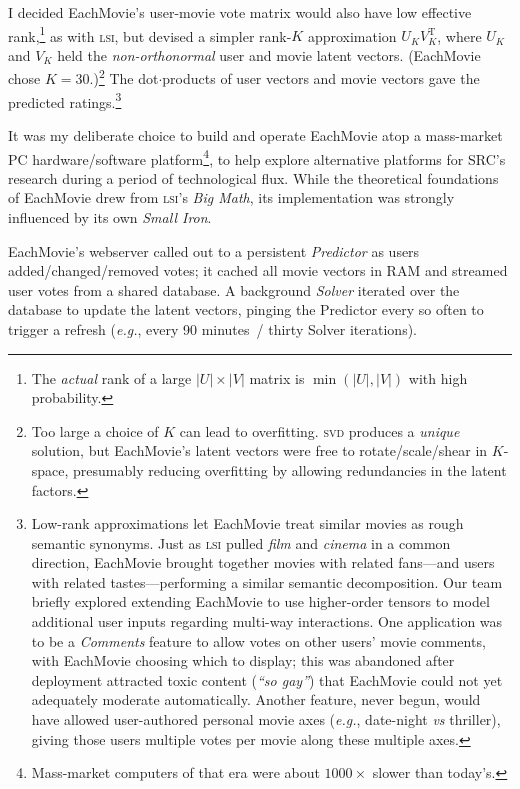 \documentclass[sigconf,authorversion,screen,microtype={protrusion=true,expansion,kerning,spacing}]{acmart}
\begin{document}
I decided EachMovie's user-movie vote matrix would also have low effective rank,\footnote{The \emph{actual} rank of a large $|U| \times |V|$ matrix is $\min(|U|, |V|)$ with high probability.} as with \textsc{lsi}, but devised a simpler rank-$K$ approximation $U_K V_K^\mathrm{T}$, where $U_K$ and $V_K$ held the \emph{non-orthonormal} user and movie latent vectors. (EachMovie chose $K = 30$.)\footnote{Too large a choice of $K$ can lead to overfitting. \textsc{svd} produces a \emph{unique} solution, but EachMovie's latent vectors were free to rotate/\allowbreak{}scale/\allowbreak{}shear in $K$-space, presumably reducing overfitting by allowing redundancies  in the latent factors.} The dot$\cdot$\allowbreak{}products of user vectors and movie vectors gave the predicted ratings.\footnote{Low-rank approximations let EachMovie treat similar movies as rough semantic synonyms. Just as \textsc{lsi} pulled \textit{film} and \textit{cinema} in a common direction, EachMovie brought together movies with related fans---and users with related tastes---performing a similar semantic decomposition. Our team briefly explored extending EachMovie to use higher-order tensors to model additional user inputs regarding multi-way interactions. One application was to be a \textit{Comments} feature to allow votes on other users' movie comments, with EachMovie choosing which to display; this was abandoned after deployment attracted toxic content (\emph{``so gay''}) that EachMovie could not yet adequately moderate automatically. Another feature, never begun, would have allowed user-authored personal movie axes (\textit{e.g.}, date-night \textit{vs} thriller), giving those users multiple votes per movie along these multiple axes.} 

It was my deliberate choice to build and operate EachMovie atop a mass-market PC hardware/\allowbreak{}software platform\footnote{Mass-market computers of that era were about $1000\times$ slower than today's.}, to help explore alternative platforms for SRC's research during a period of technological flux. While the theoretical foundations of EachMovie drew from \textsc{lsi}'s \emph{Big Math}, its implementation was strongly influenced by its own \emph{Small Iron}.

EachMovie's webserver called out to a persistent \emph{Predictor} as users added/\allowbreak{}changed/\allowbreak{}removed  votes; it cached all movie vectors in RAM and streamed user votes from a shared database. A background \emph{Solver} iterated over the database to update the latent vectors, pinging the Predictor every so often to trigger a refresh (\textit{e.g.}, every 90 minutes~/ thirty Solver iterations).
\end{document}
